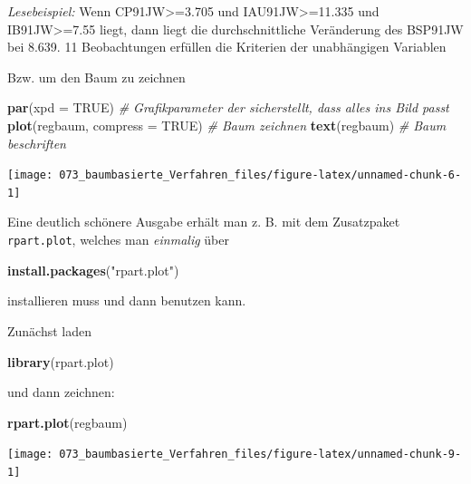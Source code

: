 \documentclass[12pt,]{book}
\newenvironment{Shaded}{\begin{snugshade}}{\end{snugshade}}
\newcommand{\KeywordTok}[1]{\textcolor[rgb]{0.13,0.29,0.53}{\textbf{{#1}}}}
\newcommand{\DataTypeTok}[1]{\textcolor[rgb]{0.13,0.29,0.53}{{#1}}}
\newcommand{\StringTok}[1]{\textcolor[rgb]{0.31,0.60,0.02}{{#1}}}
\newcommand{\CommentTok}[1]{\textcolor[rgb]{0.56,0.35,0.01}{\textit{{#1}}}}
\newcommand{\OtherTok}[1]{\textcolor[rgb]{0.56,0.35,0.01}{{#1}}}
\newcommand{\NormalTok}[1]{{#1}}
\begin{document}
\emph{Lesebeispiel:} Wenn CP91JW\textgreater{}=3.705 und
IAU91JW\textgreater{}=11.335 und IB91JW\textgreater{}=7.55 liegt, dann
liegt die durchschnittliche Veränderung des BSP91JW bei 8.639. 11
Beobachtungen erfüllen die Kriterien der unabhängigen Variablen

Bzw. um den Baum zu zeichnen

\begin{Shaded}
\begin{Highlighting}[]
\KeywordTok{par}\NormalTok{(}\DataTypeTok{xpd =} \OtherTok{TRUE}\NormalTok{) }\CommentTok{# Grafikparameter der sicherstellt, dass alles ins Bild passt}
\KeywordTok{plot}\NormalTok{(regbaum, }\DataTypeTok{compress =} \OtherTok{TRUE}\NormalTok{) }\CommentTok{# Baum zeichnen}
\KeywordTok{text}\NormalTok{(regbaum) }\CommentTok{# Baum beschriften}
\end{Highlighting}
\end{Shaded}

\begin{center}\texttt{[image: 073\_baumbasierte\_Verfahren\_files/figure-latex/unnamed-chunk-6-1]} \end{center}

Eine deutlich schönere Ausgabe erhält man z. B. mit dem Zusatzpaket
\texttt{rpart.plot}, welches man \emph{einmalig} über

\begin{Shaded}
\begin{Highlighting}[]
\KeywordTok{install.packages}\NormalTok{(}\StringTok{"rpart.plot"}\NormalTok{)}
\end{Highlighting}
\end{Shaded}

installieren muss und dann benutzen kann.

Zunächst laden

\begin{Shaded}
\begin{Highlighting}[]
\KeywordTok{library}\NormalTok{(rpart.plot)}
\end{Highlighting}
\end{Shaded}

und dann zeichnen:

\begin{Shaded}
\begin{Highlighting}[]
\KeywordTok{rpart.plot}\NormalTok{(regbaum)}
\end{Highlighting}
\end{Shaded}

\begin{center}\texttt{[image: 073\_baumbasierte\_Verfahren\_files/figure-latex/unnamed-chunk-9-1]} \end{center}
\end{document}
